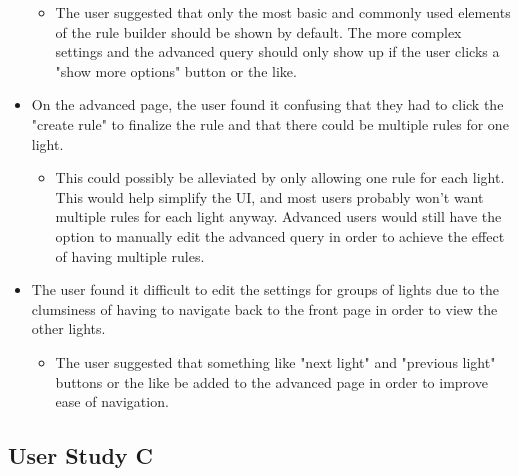 \documentclass[oneside,openright]{book}
\begin{document}
\begin{itemize}
\begin{itemize}
            \item The user suggested that only the most basic and commonly used
                elements of the rule builder should be shown by default.  The
                more complex settings and the advanced query should only show
                up if the user clicks a "show more options" button or the like.
        \end{itemize}
    \item On the advanced page, the user found it confusing that they had to
        click the "create rule" to finalize the rule and that there could be
        multiple rules for one light.
        \begin{itemize}
            \item This could possibly be alleviated by only allowing one rule
                for each light.  This would help simplify the UI, and most
                users probably won't want multiple rules for each light anyway.
                Advanced users would still have the option to manually edit the
                advanced query in order to achieve the effect of having
                multiple rules.
        \end{itemize}
    \item The user found it difficult to edit the settings for groups of lights
        due to the clumsiness of having to navigate back to the front page in
        order to view the other lights.
        \begin{itemize}
            \item The user suggested that something like "next light" and
                "previous light" buttons or the like be added to the advanced
                page in order to improve ease of navigation.
        \end{itemize}
\end{itemize}

\subsection{User Study C}
\end{document}
